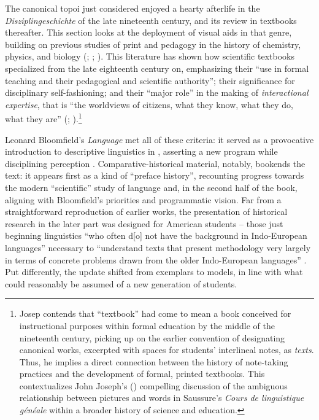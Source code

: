\documentclass[output=paper]{langscibook}
\begin{document}
The canonical topoi just considered enjoyed a hearty afterlife in the \emph{Disziplin\-geschichte} of the late nineteenth century, and its review in textbooks thereafter. This section looks at the deployment of visual aids in that genre, building on previous studies of print and pedagogy in the history of chemistry, physics, and biology (\citealt{bertomeusanchez2002}; \citealt{Kuhn1962}; \citealt{Hopwood2015}). This literature has shown how scientific textbooks specialized from the late eighteenth century on, emphasizing their ``use in formal teaching and their pedagogical and scientific authority''; their significance for disciplinary self-fashioning; and their ``major role'' in the making of \emph{interactional expertise}, that is ``the worldviews of citizens, what they know, what they do, what they are'' (\citealt[475, 479]{Simon2016}; \citealt[406--408]{Johns1998}).\footnote{Josep \citet{Simon2016} contends that ``textbook'' had come to mean a book conceived for instructional purposes within formal education by the middle of the nineteenth century, picking up on the earlier convention of designating canonical works, excerpted with spaces for students' interlineal notes, as \emph{texts}. Thus, he implies a direct connection between the history of note-taking practices and the development of formal, printed textbooks. This contextualizes John Joseph's (\citeyear{Joseph2017}) compelling discussion of the ambiguous relationship between pictures and words in Saussure's \emph{Cours de linguistique généale} within a broader history of science and education.}

Leonard Bloomfield's \emph{Language} met all of these criteria: it served as a provocative introduction to descriptive linguistics in \citeyear{Bloomfield1933}, asserting a new program while disciplining perception \citep[v-vi]{BloomfieldHoijer1965}. Comparative-historical material, notably, bookends the text: it appears first as a kind of ``preface history'', recounting progress towards the modern ``scientific'' study of language and, in the second half of the book, aligning with Bloomfield's priorities and programmatic vision. Far from a straightforward reproduction of earlier works, the presentation of historical research in the later part was designed for American students -- those just beginning linguistics ``who often d[o] not have the background in Indo-European languages'' necessary to ``understand texts that present methodology very largely in terms of concrete problems drawn from the older Indo-European languages'' \citep[vi]{BloomfieldHoijer1965}. Put differently, the update shifted from exemplars to models, in line with what could reasonably be assumed of a new generation of students.
\end{document}
